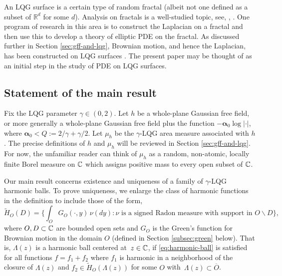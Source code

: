 \documentclass[12pt]{amsart}
\numberwithin{equation}{section}
\begin{document}
	
	An LQG surface is a certain type of random fractal (albeit not one defined as a subset of $\mathbb R^d$ for some $d$). Analysis on fractals is a well-studied topic, see, \eg, \cite{kigami2001analysis, strichartz2006differential, strichartz2020analysis}.
	One program of research in this area is to construct the Laplacian on a fractal and then use this to develop a theory of elliptic PDE on the fractal. 
	As discussed further in Section \ref{sec:gff-and-lqg}, Brownian motion, and hence the Laplacian, has been constructed on LQG surfaces \cite{garban2016liouville, berestycki2015diffusion}.
	The present paper may be thought of as an initial step in the study of PDE on LQG surfaces. 
	
	
	
	
	
	\subsection{Statement of the main result}
	
	
	Fix the LQG parameter $\gamma\in (0,2)$. Let $h$ be a whole-plane Gaussian free field, or more generally a whole-plane Gaussian free field plus the function $-\boldsymbol{\alpha}_0 \log|\cdot|$, where $\boldsymbol{\alpha}_0 < Q := 2/\gamma+\gamma/2$. Let $\mu_h$ be the $\gamma$-LQG area measure associated with $h$.
	The precise definitions of $h$ and $\mu_h$ will be reviewed in Section \ref{sec:gff-and-lqg}.
	For now, the unfamiliar reader can think of $\mu_h$ as a random, non-atomic, locally finite Borel measure on $\mathbb{C}$ which assigns positive
	mass to every open subset of $\mathbb{C}$. 
	
	
	Our main result concerns existence and uniqueness of a family of $\gamma$-LQG harmonic balls. To prove uniqueness, we enlarge the class of harmonic functions in the definition to include those of the form,
	\begin{equation} \label{eq:harmonic-fns}
	\tilde H_O(D) = \{ \int_O G_O(\cdot,y) \,\nu(dy) : \mbox{$\nu$ is a signed Radon measure with support in $O \backslash D$}\},
	\end{equation}
	where $O, D \subset \mathbb{C}$ are bounded open sets and $G_O$ is the Green's function for Brownian motion in the domain $O$
	(defined in Section \ref{subsec:green} below). 
	That is, $\Lambda(z)$ is a harmonic ball centered at~$z \in \mathbb{C}$, if \eqref{eq:harmonic-ball} is
	satisfied for all functions $f = f_1 + f_2$ where $f_1$ is harmonic in a neighborhood of the closure of $\Lambda(z)$
	and $f_2 \in \tilde H_O(\Lambda(z))$ for some $O$ with~$\Lambda(z) \subset \overline{O}$. 
	
\end{document}
